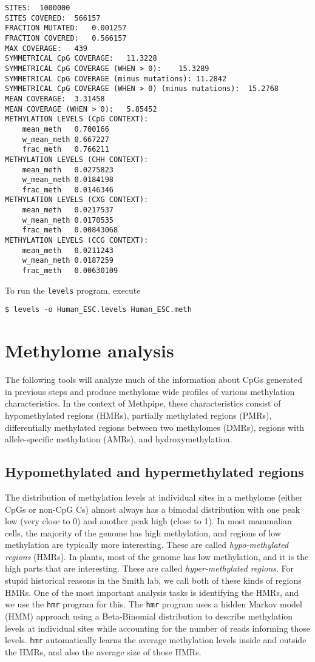 \documentclass[10pt]{article}
\newcommand{\prog}[1]{\texttt{#1}}
\begin{document}
\begin{verbatim}
SITES:	1000000
SITES COVERED:	566157
FRACTION MUTATED:	0.001257
FRACTION COVERED:	0.566157
MAX COVERAGE:	439
SYMMETRICAL CpG COVERAGE:	11.3228
SYMMETRICAL CpG COVERAGE (WHEN > 0):	15.3289
SYMMETRICAL CpG COVERAGE (minus mutations):	11.2842
SYMMETRICAL CpG COVERAGE (WHEN > 0) (minus mutations):	15.2768
MEAN COVERAGE:	3.31458
MEAN COVERAGE (WHEN > 0):	5.85452
METHYLATION LEVELS (CpG CONTEXT):
	mean_meth	0.700166
	w_mean_meth	0.667227
	frac_meth	0.766211	
METHYLATION LEVELS (CHH CONTEXT):
	mean_meth	0.0275823
	w_mean_meth	0.0184198
	frac_meth	0.0146346	
METHYLATION LEVELS (CXG CONTEXT):
	mean_meth	0.0217537
	w_mean_meth	0.0170535
	frac_meth	0.00843068	
METHYLATION LEVELS (CCG CONTEXT):
	mean_meth	0.0211243
	w_mean_meth	0.0187259
	frac_meth	0.00630109
\end{verbatim}

To run the \prog{levels} program, execute

\begin{verbatim}
$ levels -o Human_ESC.levels Human_ESC.meth
\end{verbatim}

\section{Methylome analysis}
\label{sec:high-level-analys}

The following tools will analyze much of the information about CpGs
generated in previous steps and produce methylome wide profiles of
various methylation characteristics. In the context of Methpipe, these
characteristics consist of hypomethylated regions (HMRs), partially
methylated regions (PMRs), differentially methylated regions between
two methylomes (DMRs), regions with allele-specific methylation (AMRs),
and hydroxymethylation.

\subsection{Hypomethylated and hypermethylated regions}
\label{sec:indent-hypo-methyl}

The distribution of methylation levels at individual sites in a
methylome (either CpGs or non-CpG Cs) almost always has a bimodal
distribution with one peak low (very close to 0) and another peak high
(close to 1). In most mammalian cells, the majority of the genome has
high methylation, and regions of low methylation are typically more
interesting. These are called {\em hypo-methylated regions} (HMRs). In
plants, most of the genome has low methylation, and it is the high
parts that are interesting. These are called {\em hyper-methylated
  regions}. For stupid historical reasons in the Smith lab, we call
both of these kinds of regions HMRs. One of the most important
analysis tasks is identifying the HMRs, and we use the \prog{hmr}
program for this. The \prog{hmr} program uses a hidden Markov model
(HMM) approach using a Beta-Binomial distribution to describe
methylation levels at individual sites while accounting for the number
of reads informing those levels. \prog{hmr} automatically learns the
average methylation levels inside and outside the HMRs, and also the
average size of those HMRs.
\end{document}
